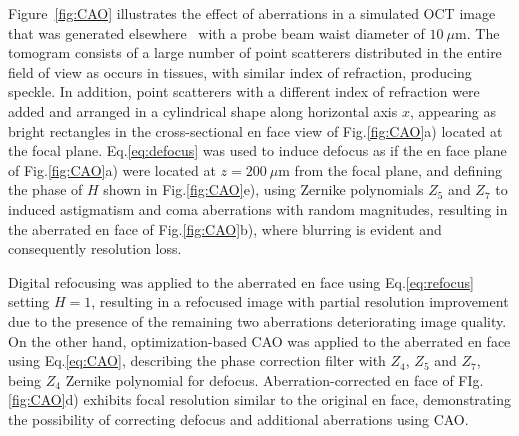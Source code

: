 Figure~\ref{fig:CAO} illustrates the effect of aberrations in a simulated OCT image that was generated elsewhere~\cite{} with a probe beam waist diameter of $10~\mu$m. The tomogram consists of a large number of point scatterers distributed in the entire field of view as occurs in tissues, with similar index of refraction, producing speckle. In addition, point scatterers with a different index of refraction were added and arranged in a cylindrical shape along horizontal axis $x$, appearing as bright rectangles in the cross-sectional en face view of Fig.\ref{fig:CAO}a) located at the focal plane. Eq.\eqref{eq:defocus} was used to induce defocus as if the en face plane of Fig.\ref{fig:CAO}a) were located at $z=200~\mu$m from the focal plane, and defining the phase of $H$ shown in Fig.\ref{fig:CAO}e), using Zernike polynomials $Z_5$ and $Z_7$ to induced astigmatism and coma aberrations with random magnitudes, resulting in the aberrated en face of Fig.\ref{fig:CAO}b), where blurring is evident and consequently resolution loss.

Digital refocusing was applied to the aberrated en face using Eq.\eqref{eq:refocus} setting $H=1$, resulting in a refocused image with partial resolution improvement due to the presence of the remaining two aberrations deteriorating image quality. On the other hand, optimization-based CAO was applied to the aberrated en face using Eq.\eqref{eq:CAO}, describing the phase correction filter with $Z_4$, $Z_5$ and $Z_7$, being $Z_4$ Zernike polynomial for defocus. Aberration-corrected en face of FIg.\ref{fig:CAO}d) exhibits focal resolution similar to the original en face, demonstrating the possibility of correcting defocus and additional aberrations using CAO.
 
